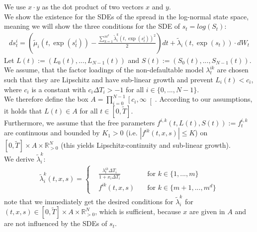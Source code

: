 \documentclass[12pt]{article}
\begin{document}
We use $x\cdot y$ as the dot product of two vectors $x$ and $y$.\\

We show the existence for the SDEs of the spread in the log-normal state space, meaning we will show the three conditions for the SDE of $s_t = log(S_t)$:
\begin{align*}
	ds^i_t = \left(\tilde{\mu}_i\left(t,\exp(s^i_t)\right) -  \frac{\sum_{k=1}^{m^d}\tilde{\lambda}^k_i\left(t,\exp(s^i_t)\right)^2}{2}\right)dt + \tilde{\lambda}_i\left(t,\exp(s_t)\right) \cdot dW_t
\end{align*}
Let $L(t) := \left(L_0(t), ..., L_{N-1}(t)\right)$ and $S(t) := \left(S_0(t), ..., S_{N-1}(t)\right)$.\\
We assume, that the factor loadings of the non-defaultable model $\lambda^{i k}_t$ are chosen such that they are Lipschitz and have sub-linear growth and prevent $L_i(t) < c_i$, where $c_i$ is a constant with $c_i\Delta T_i > -1$ for all $i \in \{0, ..., N-1\}$. \\
We therefore define the box $A = \prod_{i=0}^{N-1}\left[c_i, \infty\right[$. According to our assumptions, it holds that $L(t)\in A$ for all $t\in \left[0,\tilde{T}\right]$.\\
Furthermore, we assume that the free parameters $f^{i,k}(t,L(t), S(t)) := f^{i,k}_t$ are continuous and bounded by $K_1 > 0$ (i.e. $|f^{ik}(t,x,s)| \le K$) on $\left[0,\tilde{T}\right]\times A \times \mathbb{R}_{>0}^N$ (this yields Lipschitz-continuity and sub-linear growth).
\\
We derive $\tilde{\lambda}^k_i$:
\begin{align*}
	\tilde{\lambda}^k_i\left(t,x, s\right) = 
	\left\{
	\begin{aligned}
		&\frac{\lambda^{i k}_t \Delta T_i}{1 + x_i\Delta T_i} \quad &\text{for } k \in \{1,...,m\}\\
		&f^{i k}(t,x,s) \quad &\text{for } k \in \{m+1,...,m^d\}
	\end{aligned}
	\right.
\end{align*}
note that we immediately get the desired conditions for $\tilde{\lambda}^k_i$ for $(t,x,s) \in \left[0,\tilde{T}\right]\times A\times\mathbb{R}_{>0}^{N}$, which is sufficient, because $x$ are given in $A$ and are not influenced by the SDEs of $s_t$.\\
\end{document}
